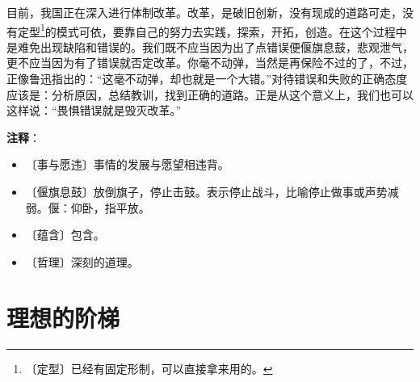\documentclass[12pt,UTF-8,openany]{ctexbook}
\begin{document}
\begin{normalsize}
    目前，我国正在深入进行体制改革。改革，是破旧创新，没有现成的道路可走，没有定型\footnote{〔定型〕已经有固定形制，可以直接拿来用的。}的模式可依，要靠自己的努力去实践，探索，开拓，创造。在这个过程中是难免出现缺陷和错误的。我们既不应当因为出了点错误便偃旗息鼓，悲观泄气，更不应当因为有了错误就否定改革。你毫不动弹，当然是再保险不过的了，不过，正像鲁迅指出的：“这毫不动弹，却也就是一个大错。”对待错误和失败的正确态度应该是：分析原因，总结教训，找到正确的道路。正是从这个意义上，我们也可以这样说：“畏惧错误就是毁灭改革。”
    
\end{normalsize}


\newpage

\textbf{注释}：

\vspace{-1em}

\begin{itemize}
    \setlength\itemsep{-0.2em}
    \item 〔事与愿违〕事情的发展与愿望相违背。
    \item 〔偃旗息鼓〕放倒旗子，停止击鼓。表示停止战斗，比喻停止做事或声势减弱。偃：仰卧，指平放。
    \item 〔蕴含〕包含。
    \item 〔哲理〕深刻的道理。
\end{itemize}

\chapter{理想的阶梯}
\end{document}
